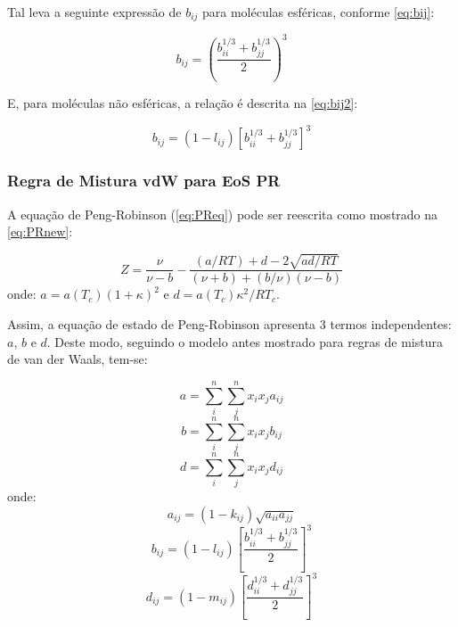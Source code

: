 Tal leva a seguinte expressão de $b_{ij}$ para moléculas esféricas, conforme
\autoref{eq:bij}:

\begin{equation}\label{eq:bij}
b_{ij} = \left ( \frac{b_{ii}^{1/3} + b_{jj}^{1/3}}{2} \right )^3
\end{equation}

E, para moléculas não esféricas, a relação é descrita na \autoref{eq:bij2}:

\begin{equation}\label{eq:bij2}
b_{ij} = (1 - l_{ij})\left [ b_{ii}^{1/3} + b_{jj}^{1/3} \right ]^3
\end{equation}

\subsubsection{Regra de Mistura vdW para EoS PR}

A equação de Peng-Robinson (\autoref{eq:PReq}) pode ser reescrita como mostrado
na \autoref{eq:PRnew}:

\begin{equation}\label{eq:PRnew}
Z = \frac{\nu}{\nu - b} - \frac{(a/RT) + d - 2 \sqrt{ad/RT}}{(\nu + b) +
(b/\nu)(\nu - b)}
\end{equation}
onde: $a = a(T_c)(1 + \kappa)^2$ e $d = a(T_c)\kappa^2/RT_c$.

Assim, a equação de estado de Peng-Robinson apresenta 3 termos
independentes: $a$, $b$ e $d$. Deste modo, seguindo o modelo antes mostrado para
regras de mistura de van der Waals, tem-se:

\begin{equation}\label{eq:PRnew1}
a = \displaystyle\sum_i^n\sum_j^nx_ix_ja_{ij}
\end{equation}
\begin{equation}\label{eq:PRnew2}
b = \displaystyle\sum_i^n\sum_j^nx_ix_jb_{ij}
\end{equation}
\begin{equation}\label{eq:PRnew3}
d = \displaystyle\sum_i^n\sum_j^nx_ix_jd_{ij}
\end{equation}
onde: 
\begin{equation}\label{eq:PRnew4}
a_{ij} = (1 - k_{ij})\sqrt{a_{ii}a_{jj}}
\end{equation}
\begin{equation}\label{eq:PRnew5}
b_{ij} = (1 - l_{ij})\left [ \frac{b_{ii}^{1/3} + b_{jj}^{1/3}}{2} \right]^3
\end{equation}
\begin{equation}\label{eq:PRnew6}
d_{ij} = (1 -m_{ij})\left [ \frac{d_{ii}^{1/3} + d_{jj}^{1/3}}{2} \right]^3
\end{equation}

